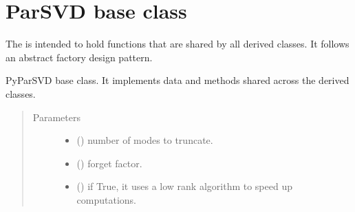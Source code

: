 \documentclass[letterpaper,10pt,english]{sphinxmanual}
\begin{document}
\section{ParSVD base class}
\label{\detokenize{index:parsvd-base-class}}
\sphinxAtStartPar
The  is intended to hold functions that are shared
by all derived classes. It follows an abstract factory design pattern.

\label{\detokenize{index:module-pyparsvd.parsvd_base}}

\begin{fulllineitems}
\label{\detokenize{index:pyparsvd.parsvd_base.ParSVD_Base}}
\sphinxAtStartPar
PyParSVD base class. It implements data and methods shared
across the derived classes.
\begin{quote}\begin{description}
\item[{Parameters}] \leavevmode\begin{itemize}
\item {} 
\sphinxAtStartPar
{} () \textendash{} number of modes to truncate.

\item {} 
\sphinxAtStartPar
{} () \textendash{} forget factor.

\item {} 
\sphinxAtStartPar
{} () \textendash{} if True, it uses a low rank algorithm to speed up computations.


\end{itemize}
\end{description}
\end{quote}
\end{fulllineitems}
\end{document}
